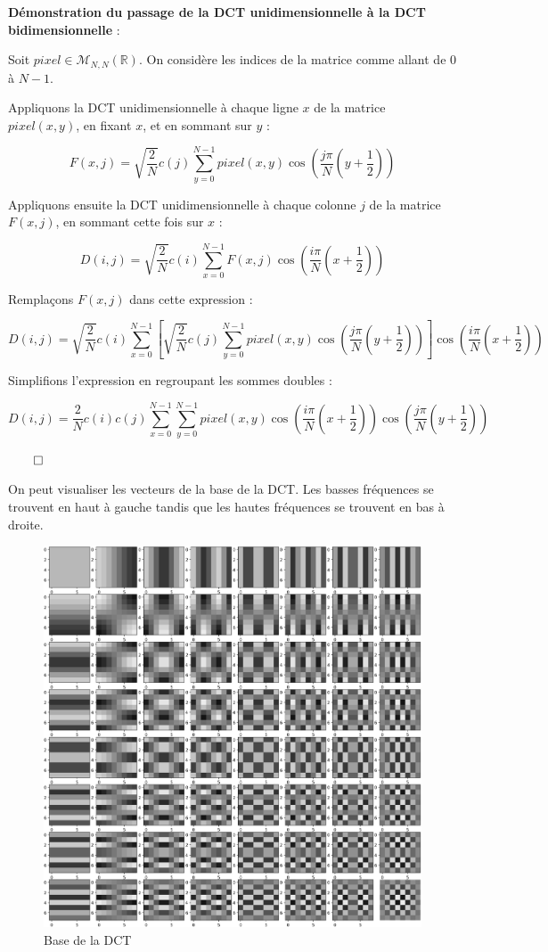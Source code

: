 \documentclass{article}
\newenvironment{myproof}[1][\proofname]{%
  \begin{proofbox}%
}{\hfill$\qed$\end{proofbox}}
\begin{document}
\begin{myproof}
    
    \textbf{Démonstration du passage de la DCT unidimensionnelle à la DCT bidimensionnelle} :
    
    \vspace{.25cm}

    Soit $pixel \in \mathcal{M}_{N,N}(\mathbb{R})$. On considère les indices de la matrice comme allant de 0 à $N-1$.

    \vspace{.2cm}
    
    Appliquons la DCT unidimensionnelle à chaque ligne $x$ de la matrice $pixel(x, y)$, en fixant $x$, et en sommant sur $y$ :
    
    $$
    F(x, j) = \sqrt{\dfrac{2}{N}} c(j) \sum_{y=0}^{N-1} pixel(x, y) \cos\left( \frac{j\pi}{N} \left( y + \frac{1}{2} \right) \right)
    $$
    
    Appliquons ensuite la DCT unidimensionnelle à chaque colonne $j$ de la matrice $F(x, j)$, en sommant cette fois sur $x$ :
    
    $$
    D(i, j) = \sqrt{\dfrac{2}{N}} c(i) \sum_{x=0}^{N-1} F(x, j) \cos\left( \frac{i\pi}{N} \left( x + \frac{1}{2} \right) \right)
    $$
    
    Remplaçons $F(x, j)$ dans cette expression :
    
    $$
    D(i, j) = \sqrt{\dfrac{2}{N}}c(i) \sum_{x=0}^{N-1} \left[\sqrt{\dfrac{2}{N}} c(j) \sum_{y=0}^{N-1} pixel(x, y) \cos\left( \frac{j\pi}{N} \left( y + \frac{1}{2} \right) \right) \right] \cos\left( \frac{i\pi}{N} \left( x + \frac{1}{2} \right) \right)
    $$
    
    Simplifions l’expression en regroupant les sommes doubles :
    
    $$
    D(i, j) = \frac{2}{N} c(i)c(j) \sum_{x=0}^{N-1} \sum_{y=0}^{N-1} pixel(x, y) \cos\left( \frac{i\pi}{N} \left( x + \frac{1}{2} \right) \right) \cos\left( \frac{j\pi}{N} \left( y + \frac{1}{2} \right) \right)
    $$

\end{myproof}

On peut visualiser les vecteurs de la base de la DCT. Les basses fréquences se trouvent en haut à gauche tandis que les hautes fréquences se trouvent en bas à droite.

\begin{figure}[H]
    \centering
    \includegraphics[width=.3\linewidth]{base_dct.png}
    \caption{Base de la DCT}
\end{figure}
\end{document}
